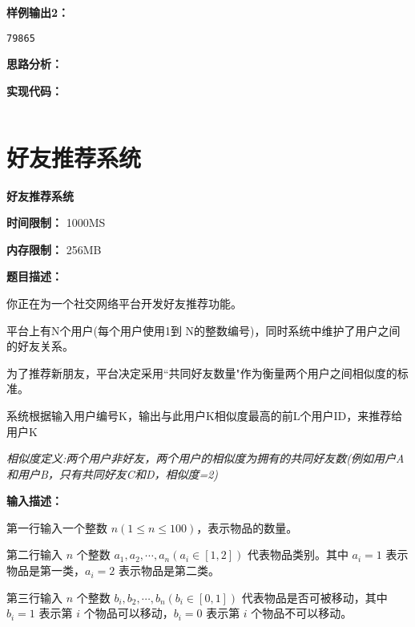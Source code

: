 \documentclass[a4paper]{ctexart}
\begin{document}
\noindent\textbf{样例输出2：}
\lstset{numbers=none}
\begin{lstlisting}
79865
\end{lstlisting}
\lstset{numbers=left}
	
\vspace{10pt}
	
\noindent\textbf{思路分析：}

\noindent\textbf{实现代码：}
	
\begin{lstlisting}

\end{lstlisting}
	
\newpage
	
\section{好友推荐系统}
	
\begin{center}
	\Large \textbf{好友推荐系统}
\end{center}
	
\noindent\textbf{时间限制：} 1000MS
	
\noindent\textbf{内存限制：} 256MB
	
\vspace{10pt}
	
\noindent\textbf{题目描述：}
	
你正在为一个社交网络平台开发好友推荐功能。

平台上有N个用户(每个用户使用1到 N的整数编号)，同时系统中维护了用户之间的好友关系。

为了推荐新朋友，平台决定采用“共同好友数量"作为衡量两个用户之间相似度的标准。

系统根据输入用户编号K，输出与此用户K相似度最高的前L个用户ID，来推荐给用户K

\textit{相似度定义:两个用户非好友，两个用户的相似度为拥有的共同好友数(例如用户A和用户B，只有共同好友C和D，相似度=2)}
	
\noindent\textbf{输入描述：}
	
第一行输入一个整数 $n (1 \leq n \leq 100)$，表示物品的数量。
	
第二行输入 $n$ 个整数 $a_1,a_2,\cdots,a_n (a_i \in [1,2])$ 代表物品类别。其中 $a_i = 1$ 表示物品是第一类，$a_i = 2$ 表示物品是第二类。
	
第三行输入 $n$ 个整数 $b_i,b_2,\cdots,b_n (b_i \in [0,1])$ 代表物品是否可被移动，其中 $b_i = 1$ 表示第 $i$ 个物品可以移动，$b_i = 0$ 表示第 $i$ 个物品不可以移动。
	
\end{document}
